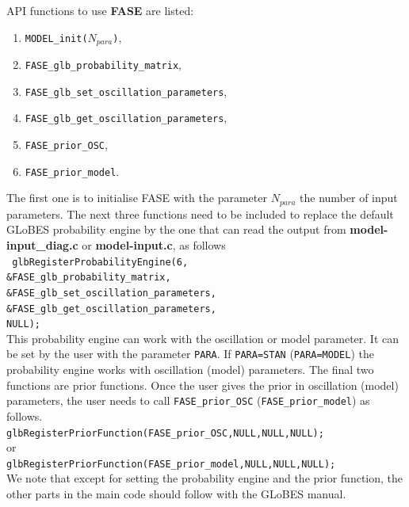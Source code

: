 \documentclass[a4paper,11pt]{article}
\begin{document}
API functions to use \textbf{FASE} are listed:
\begin{enumerate}
\item \texttt{MODEL\_init($N_{para}$)},
\item  \texttt{FASE\_glb\_probability\_matrix},
\item  \texttt{FASE\_glb\_set\_oscillation\_parameters},
\item  \texttt{FASE\_glb\_get\_oscillation\_parameters},
\item \texttt{FASE\_prior\_OSC},
\item \texttt{FASE\_prior\_model}.
\end{enumerate}
The first one is to initialise FASE with the parameter $N_{para}$ the number of input parameters. The next three functions need to be included to replace the default GLoBES probability engine by the one that can read the output from  \textbf{model-input\_diag.c} or \textbf{model-input.c}, as follows\vspace{0.2cm}\\
\texttt{    glbRegisterProbabilityEngine(6,\\
                                 \&FASE\_glb\_probability\_matrix,\\
                                 \&FASE\_glb\_set\_oscillation\_parameters,\\
                                 \&FASE\_glb\_get\_oscillation\_parameters,\\
                                 NULL); }\vspace{0.2cm}\\ 
This probability engine can work with the oscillation or model parameter. It can be set by the user with the parameter \texttt{PARA}. If \texttt{PARA=STAN} (\texttt{PARA=MODEL}) the probability engine works with oscillation (model) parameters. The final two functions are prior functions. Once the user gives the prior in oscillation (model) parameters, the user needs to call \texttt{FASE\_prior\_OSC} (\texttt{FASE\_prior\_model}) as follows.\vspace{0.2cm}\\
\texttt{glbRegisterPriorFunction(FASE\_prior\_OSC,NULL,NULL,NULL); }  \\
or\\
\texttt{glbRegisterPriorFunction(FASE\_prior\_model,NULL,NULL,NULL); } \vspace{0.2cm}\\
We note that except for setting the probability engine and the prior function, the other parts in the main code should follow with the GLoBES manual. 
\end{document}
